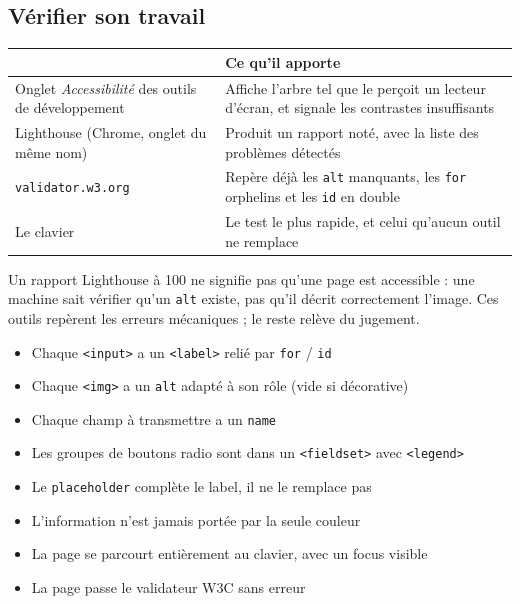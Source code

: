 \documentclass[a4paper,11pt]{article}
\newcommand{\hdr}[1]{\multicolumn{1}{l}{\color{white}\bfseries #1}}
\renewcommand{\arraystretch}{1.3}
\begin{document}
\subsection{Vérifier son travail}

\begin{center}
\renewcommand{\arraystretch}{1.0}
\begin{tabularx}{\linewidth}{p{4.4cm}X}
  \toprule
  \rowcolor{uniNavy}
  \hdr{Outil} & \hdr{Ce qu'il apporte} \\
  \midrule
  \rowcolor{uniPaper}
  Onglet \textit{Accessibilité} des outils de développement & Affiche l'arbre tel que le perçoit un lecteur d'écran, et signale les contrastes insuffisants \\
  Lighthouse (Chrome, onglet du même nom) & Produit un rapport noté, avec la liste des problèmes détectés \\
  \rowcolor{uniPaper}
  \texttt{validator.w3.org} & Repère déjà les \texttt{alt} manquants, les \texttt{for} orphelins et les \texttt{id} en double \\
  Le clavier & Le test le plus rapide, et celui qu'aucun outil ne remplace \\
  \bottomrule
\end{tabularx}
\end{center}

\begin{tcolorbox}[attention, title={Aucun outil automatique ne suffit}]
Un rapport Lighthouse à 100 ne signifie pas qu'une page est accessible : une machine sait vérifier qu'un \texttt{alt} existe, pas qu'il décrit correctement l'image. Ces outils repèrent les erreurs mécaniques ; le reste relève du jugement.
\end{tcolorbox}

\begin{tcolorbox}[definition, title={Mémo --- les huit réflexes de la semaine}]
\begin{itemize}
  \item Chaque \texttt{<input>} a un \texttt{<label>} relié par \texttt{for} / \texttt{id}
  \item Chaque \texttt{<img>} a un \texttt{alt} adapté à son rôle (vide si décorative)
  \item Chaque champ à transmettre a un \texttt{name}
  \item Les groupes de boutons radio sont dans un \texttt{<fieldset>} avec \texttt{<legend>}
  \item Le \texttt{placeholder} complète le label, il ne le remplace pas
  \item L'information n'est jamais portée par la seule couleur
  \item La page se parcourt entièrement au clavier, avec un focus visible
  \item La page passe le validateur W3C sans erreur
\end{itemize}
\end{tcolorbox}
\end{document}
